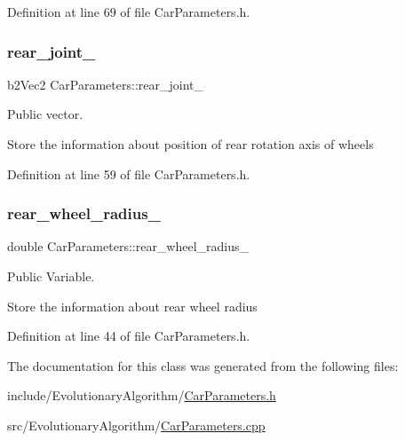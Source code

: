 Definition at line 69 of file Car\+Parameters.\+h.

\mbox{\label{classCarParameters_aec19cf9d1c6ab5f00ac5ff166ee0015a}} 
\subsubsection{\texorpdfstring{rear\+\_\+joint\+\_\+}{rear\_joint\_}}
{\footnotesize\ttfamily b2\+Vec2 Car\+Parameters\+::rear\+\_\+joint\+\_\+}



Public vector. 

Store the information about position of rear rotation axis of wheels 

Definition at line 59 of file Car\+Parameters.\+h.

\mbox{\label{classCarParameters_a6d3c3fc1c4eef292a7f536da2a089bbd}} 
\subsubsection{\texorpdfstring{rear\+\_\+wheel\+\_\+radius\+\_\+}{rear\_wheel\_radius\_}}
{\footnotesize\ttfamily double Car\+Parameters\+::rear\+\_\+wheel\+\_\+radius\+\_\+}



Public Variable. 

Store the information about rear wheel radius 

Definition at line 44 of file Car\+Parameters.\+h.



The documentation for this class was generated from the following files\+:\begin{DoxyCompactItemize}
\item 
include/\+Evolutionary\+Algorithm/\hyperlink{CarParameters_8h}{Car\+Parameters.\+h}\item 
src/\+Evolutionary\+Algorithm/\hyperlink{CarParameters_8cpp}{Car\+Parameters.\+cpp}\end{DoxyCompactItemize}
